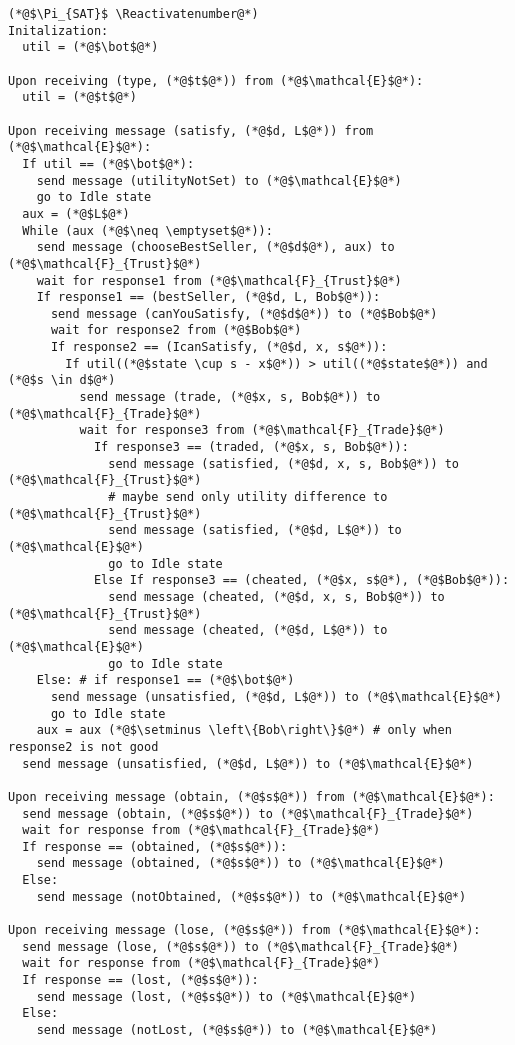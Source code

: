 \Suppressnumber
\begin{lstlisting}[label=satprot, style=numbers]
(*@$\Pi_{SAT}$ \Reactivatenumber@*)
Initalization:
  util = (*@$\bot$@*)

Upon receiving (type, (*@$t$@*)) from (*@$\mathcal{E}$@*):
  util = (*@$t$@*)

Upon receiving message (satisfy, (*@$d, L$@*)) from (*@$\mathcal{E}$@*):
  If util == (*@$\bot$@*):
    send message (utilityNotSet) to (*@$\mathcal{E}$@*)
    go to Idle state
  aux = (*@$L$@*)
  While (aux (*@$\neq \emptyset$@*)):
    send message (chooseBestSeller, (*@$d$@*), aux) to (*@$\mathcal{F}_{Trust}$@*)
    wait for response1 from (*@$\mathcal{F}_{Trust}$@*)
    If response1 == (bestSeller, (*@$d, L, Bob$@*)):
      send message (canYouSatisfy, (*@$d$@*)) to (*@$Bob$@*)
      wait for response2 from (*@$Bob$@*)
      If response2 == (IcanSatisfy, (*@$d, x, s$@*)):
        If util((*@$state \cup s - x$@*)) > util((*@$state$@*)) and (*@$s \in d$@*)
          send message (trade, (*@$x, s, Bob$@*)) to (*@$\mathcal{F}_{Trade}$@*)
          wait for response3 from (*@$\mathcal{F}_{Trade}$@*)
            If response3 == (traded, (*@$x, s, Bob$@*)):
              send message (satisfied, (*@$d, x, s, Bob$@*)) to (*@$\mathcal{F}_{Trust}$@*)
              # maybe send only utility difference to (*@$\mathcal{F}_{Trust}$@*)
              send message (satisfied, (*@$d, L$@*)) to (*@$\mathcal{E}$@*)
              go to Idle state
            Else If response3 == (cheated, (*@$x, s$@*), (*@$Bob$@*)):
              send message (cheated, (*@$d, x, s, Bob$@*)) to (*@$\mathcal{F}_{Trust}$@*)
              send message (cheated, (*@$d, L$@*)) to (*@$\mathcal{E}$@*)
              go to Idle state
    Else: # if response1 == (*@$\bot$@*)
      send message (unsatisfied, (*@$d, L$@*)) to (*@$\mathcal{E}$@*)
      go to Idle state
    aux = aux (*@$\setminus \left\{Bob\right\}$@*) # only when response2 is not good
  send message (unsatisfied, (*@$d, L$@*)) to (*@$\mathcal{E}$@*)

Upon receiving message (obtain, (*@$s$@*)) from (*@$\mathcal{E}$@*):
  send message (obtain, (*@$s$@*)) to (*@$\mathcal{F}_{Trade}$@*)
  wait for response from (*@$\mathcal{F}_{Trade}$@*)
  If response == (obtained, (*@$s$@*)):
    send message (obtained, (*@$s$@*)) to (*@$\mathcal{E}$@*)
  Else:
    send message (notObtained, (*@$s$@*)) to (*@$\mathcal{E}$@*)

Upon receiving message (lose, (*@$s$@*)) from (*@$\mathcal{E}$@*):
  send message (lose, (*@$s$@*)) to (*@$\mathcal{F}_{Trade}$@*)
  wait for response from (*@$\mathcal{F}_{Trade}$@*)
  If response == (lost, (*@$s$@*)):
    send message (lost, (*@$s$@*)) to (*@$\mathcal{E}$@*)
  Else:
    send message (notLost, (*@$s$@*)) to (*@$\mathcal{E}$@*)


\end{lstlisting}
